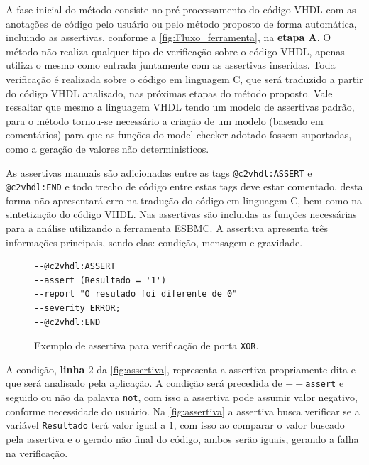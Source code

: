 \par
A fase inicial do método consiste no pré-processamento do código VHDL com as anotações de código pelo usuário ou pelo método proposto de forma automática, incluindo as assertivas, conforme a \autoref{fig:Fluxo_ferramenta}, na \textbf{etapa A}. O método não realiza qualquer tipo de verificação sobre o código VHDL, apenas utiliza o mesmo como entrada juntamente com as assertivas inseridas. Toda verificação é realizada sobre o código em linguagem C, que será traduzido a partir do código VHDL analisado, nas próximas etapas do método proposto. Vale ressaltar que mesmo a linguagem VHDL tendo um modelo de assertivas padrão, para o método tornou-se necessário a criação de um modelo (baseado em comentários) para que as funções do model checker adotado fossem suportadas, como a geração de valores não deterministicos.

\par
\label{sec:assertiva_descricao} As assertivas manuais são adicionadas entre as tags \texttt{@c2vhdl:ASSERT} e \texttt{@c2vhdl:END} e todo trecho de código entre estas tags deve estar comentado, desta forma não apresentará erro na tradução do código em linguagem C, bem como na sintetização do código VHDL. Nas assertivas são incluidas as funções necessárias para a análise utilizando a ferramenta ESBMC. A assertiva apresenta três informações principais, sendo elas: condição, mensagem e gravidade.

\begin{figure}[H]
\caption{\label{fig:assertiva} Exemplo de assertiva para verificação de porta \texttt{XOR}.}
	\begin{center}
    \begin{minipage}{0.99\textwidth}
    \begin{lstlisting}       
--@c2vhdl:ASSERT
--assert (Resultado = '1')
--report "O resutado foi diferente de 0"
--severity ERROR;
--@c2vhdl:END
    \end{lstlisting}
    \end{minipage}
	\end{center}
\end{figure}

\par
A condição, \textbf{linha $2$} da \autoref{fig:assertiva}, representa a assertiva propriamente dita e que será analisado pela aplicação. A condição será precedida de \texttt{$--$assert} e seguido ou não da palavra \texttt{not}, com isso a assertiva pode assumir valor negativo, conforme necessidade do usuário. Na \autoref{fig:assertiva} a assertiva busca verificar se a variável \texttt{Resultado} terá valor igual a $1$, com isso ao comparar o valor buscado pela assertiva e o gerado não final do código, ambos serão iguais, gerando a falha na verificação.


